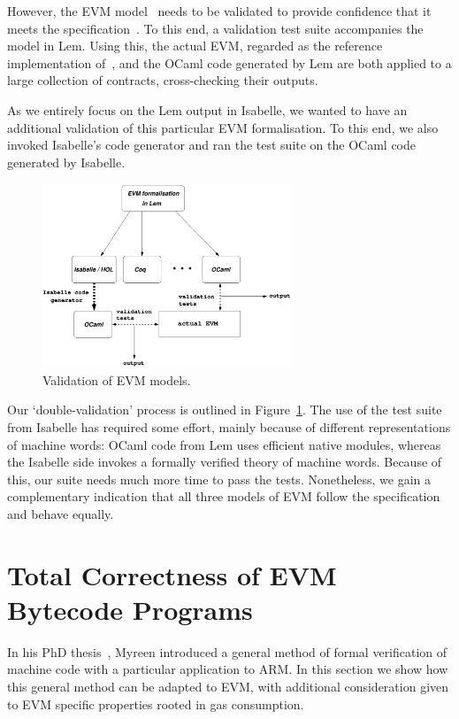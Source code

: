 \documentclass[sigplan,10pt]{acmart}\settopmatter{printfolios=true,printccs=false,printacmref=false}
\begin{document}
However, the EVM model~\cite{Yoichi} needs to be validated to provide confidence that it
meets the specification~\cite{wood2014ethereum}. 
To this end, a validation test suite accompanies
the model in Lem. Using this, the actual EVM, regarded as the reference implementation of~\cite{wood2014ethereum}, 
and the OCaml code generated by Lem %
are both applied to a large collection of contracts, cross-checking their outputs.  

As we entirely focus on the Lem output in Isabelle, we wanted to
have an additional validation of this particular EVM formalisation. 
To this end, we also invoked Isabelle's code generator and ran the test suite 
on the OCaml code generated by Isabelle.

\begin{figure}[ht!]
\centering
\includegraphics[height=5.5cm, width=7.5cm]{images/evm_lem}    
        \caption{Validation of EVM models.}
\label{fig:valid}
\end{figure}

Our `double-validation' process is outlined in Figure~\ref{fig:valid}.
The use of the test suite from Isabelle has required some effort, mainly because 
of different representations of machine words: OCaml code from Lem uses efficient native modules,
whereas the Isabelle side invokes a formally verified theory of machine words.
Because of this, our suite needs much more time to pass the tests.
Nonetheless, we gain a complementary indication that all three models of EVM follow the specification
and behave equally.    
%
\section{Total Correctness of EVM Bytecode Programs}
\label{sec:corr}
In his PhD thesis~\cite{DBLP:phd/ethos/Myreen09}, Myreen introduced a general 
method of formal verification of
machine code with a particular application to ARM. In this section we show how
this general method can be adapted to EVM, with additional consideration given to
EVM specific properties rooted in gas consumption.
 
\end{document}
